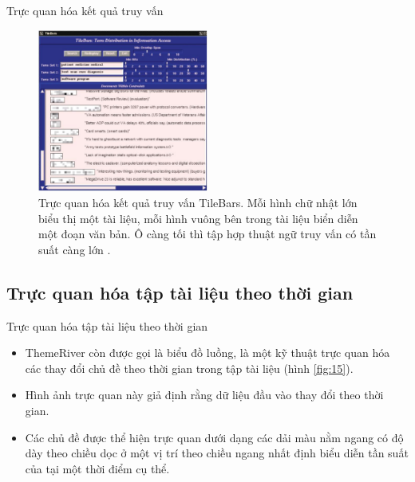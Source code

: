 \documentclass[10pt]{beamer}
\theoremstyle{remark}
\theoremstyle{definition}
\begin{document}
\begin{frame}{Trực quan hóa kết quả truy vấn}
	\begin{figure}[h!]
        \centering
        \includegraphics[width=0.5\textwidth]{14.png}
        \caption{Trực quan hóa kết quả truy vấn TileBars.
        Mỗi hình chữ nhật lớn biểu thị một tài liệu, mỗi hình vuông bên trong tài liệu biển diễn một đoạn văn bản.
        Ô càng tối thì tập hợp thuật ngữ truy vấn có tần suất càng lớn \cite{178}.}
        \label{fig:14}
    \end{figure}
\end{frame}

\subsection{Trực quan hóa tập tài liệu theo thời gian}

\begin{frame}{Trực quan hóa tập tài liệu theo thời gian}
	\begin{itemize}
		\item ThemeRiver \cite{173} còn được gọi là biểu đồ luồng, là một kỹ thuật trực quan hóa các thay đổi chủ đề theo thời gian trong tập tài liệu (hình \ref{fig:15}).
		\item Hình ảnh trực quan này giả định rằng dữ liệu đầu vào thay đổi theo thời gian.
		\item Các chủ đề được thể hiện trực quan dưới dạng các dải màu nằm ngang có độ dày theo chiều dọc ở một vị trí theo chiều ngang nhất định biểu diễn tần suất của tại một thời điểm cụ thể.
	\end{itemize}
\end{frame}
\end{document}
